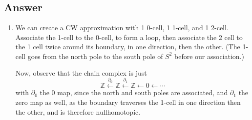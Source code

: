 \documentclass[11pt]{article}
\begin{document}
\subsection{Answer}
\begin{enumerate}
\item We can create a CW approximation with 1 0-cell, 1 1-cell, and 1 2-cell. Associate the 1-cell to the 0-cell, to form a loop, then associate the 2 cell to the 1 cell twice around its boundary, in one direction, then the other. (The 1-cell goes from the north pole to the south pole of $S^2$ before our association.)

Now, observe that the chain complex is just 
\[\mathbb{Z} \stackrel{\partial_0}{\leftarrow} \mathbb{Z} \stackrel{\partial_1}{\leftarrow} \mathbb{Z} \leftarrow 0 \leftarrow \cdots\]
with $\partial_0$ the 0 map, since the north and south poles are associated, and $\partial_1$ the zero map as well, as the boundary traverses the 1-cell in one direction then the other, and is therefore nullhomotopic.


\end{enumerate}
\end{document}
